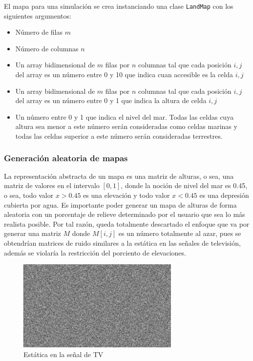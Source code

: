 El mapa para una simulación se crea instanciando una clase \verb|LandMap| con los siguientes argumentos:

\begin{itemize}
	\item Número de filas $m$
	\item Número de columnas $n$
	\item Un array bidimensional de $m$ filas por $n$ columnas tal que cada posición $i,j$ del array es un número entre 0 y 10 que indica cuan accesible es la celda $i,j$
	\item Un array bidimensional de $m$ filas por $n$ columnas tal que cada posición $i,j$ del array es un número entre 0 y 1 que indica la altura de celda $i,j$
	\item Un número entre 0 y 1 que indica el nivel del mar. Todas las celdas cuya altura sea menor a este número serán consideradas como celdas marinas y todas las celdas superior a este número serán consideradas terrestres.
\end{itemize}

\subsubsection{Generación aleatoria de mapas}

La representación abstracta de un mapa es una matriz de alturas, o sea, una matriz de valores en el intervalo $[0,1]$, donde la noción de nivel del mar es 0.45, o sea, todo valor $x > 0.45$ es una elevación y todo valor $x < 0.45$ es una depresión cubierta por agua. Es importante poder generar un mapa de alturas de forma aleatoria con un porcentaje de relieve determinado por el usuario que sea lo más realista posible. Por tal razón, queda totalmente descartado el enfoque que va por generar una matriz $M$ donde $M[i,j]$ es un número totalmente al azar, pues se obtendrían matrices de ruido similares a la estática en las señales de televisión, además se violaría la restricción del porciento de elevaciones.

\begin{figure}
	\centering
	\includegraphics[width=8cm]{chapters/img/estatica.jpg}
	\caption{Estática en la señal de TV}
\end{figure}


